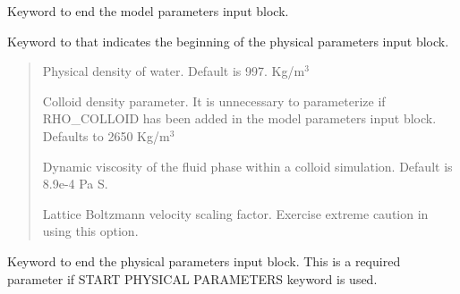 \documentclass[letterpaper,10pt,english]{sphinxmanual}
\begin{document}
 Keyword to end the model parameters
input block.

 Keyword to that indicates the
beginning of the physical parameters input block.
\begin{quote}

 Physical density of water. Default is 997.
Kg/m$^{\text{3}}$

 Colloid density parameter. It is
unnecessary to parameterize if RHO\_COLLOID has been added in the
model parameters input block. Defaults to 2650 Kg/m$^{\text{3}}$

 Dynamic viscosity of the fluid phase within
a colloid simulation. Default is 8.9e-4 Pa S.

 Lattice Boltzmann velocity scaling factor.
Exercise extreme caution in using this option.
\end{quote}

 Keyword to end the physical
parameters input block. This is a required parameter if START PHYSICAL
PARAMETERS keyword is used.
\end{document}
